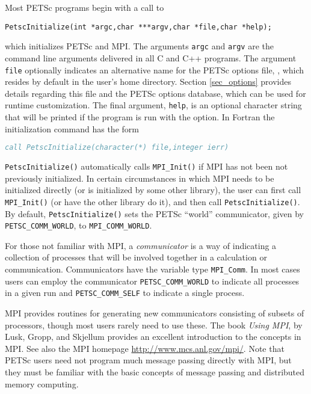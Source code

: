 {{Most PETSc programs begin with a call to
\begin{lstlisting}
PetscInitialize(int *argc,char ***argv,char *file,char *help);
\end{lstlisting}
which initializes PETSc and MPI.  The arguments \lstinline{argc} and
\lstinline{argv} are the command line arguments delivered in all C and C++
programs.  The argument \lstinline{file}
optionally indicates an alternative name for the PETSc options file,
, which resides by default in the user's home directory.
Section \ref{sec_options} provides details regarding
this file and the PETSc options database, which can be used for runtime
customization. The final argument, \lstinline{help}, is an optional
character string that will be printed if the program is run with the
 option.  In Fortran the initialization command has the form
\begin{lstlisting}[language=fortran]
call PetscInitialize(character(*) file,integer ierr)
\end{lstlisting}
\lstinline{PetscInitialize()} automatically calls \lstinline{MPI_Init()} if MPI
has not been not previously initialized. In certain 
circumstances in which MPI needs to be initialized directly (or is
initialized by some other library), the user can first call
\lstinline{MPI_Init()} (or have the other library do it), and then call
\lstinline{PetscInitialize()}.
By default, \lstinline{PetscInitialize()} sets the PETSc ``world''
communicator, given by \lstinline{PETSC_COMM_WORLD}, to \lstinline{MPI_COMM_WORLD}.

For those not familiar with MPI, a {\em communicator} is a way of
indicating a collection of processes that will be involved together
in a calculation or communication. Communicators have the variable type
\lstinline{MPI_Comm}. In most cases users can employ the communicator
\lstinline{PETSC_COMM_WORLD} to indicate all processes in a given run and
\lstinline{PETSC_COMM_SELF} to indicate a single process.

MPI provides routines
for generating new communicators consisting of subsets of processors,
though most users rarely need to use these. The book {\em Using MPI},
by Lusk, Gropp, and Skjellum \cite{using-mpi} provides an excellent
introduction to the concepts in MPI. See also the MPI homepage
\href{http://www.mcs.anl.gov/mpi/}{http://www.mcs.anl.gov/mpi/}.
Note that PETSc users need not program much message passing directly
with MPI, but they must be familiar with the basic concepts of message
passing and distributed memory computing.

}}
